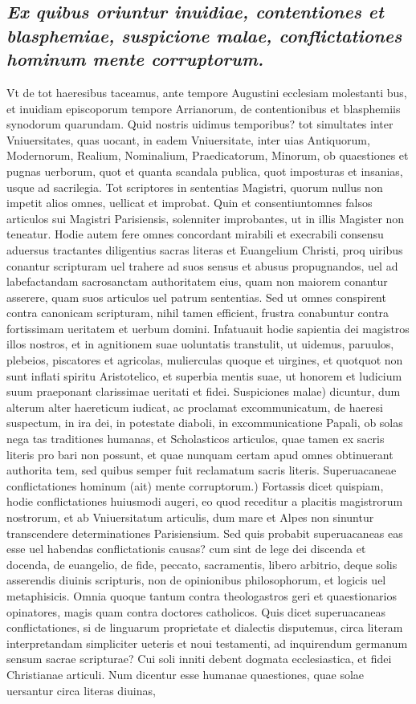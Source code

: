 \documentclass{article}
\begin{document}
\begin{pages}
\subsection*{\textit{Ex quibus oriuntur inuidiae, contentiones et blasphemiae, suspicione malae, conflictationes hominum mente corruptorum. }}\pstart Vt de tot haeresibus taceamus, ante tempore Augustini ecclesiam molestanti bus, et inuidiam episcoporum tempore Arrianorum, de contentionibus et blasphemiis synodorum quarundam. Quid nostris uidimus temporibus? tot simultates inter Vniuersitates, quas uocant, in eadem Vniuersitate, inter uias Antiquorum, Modernorum, Realium, Nominalium, Praedicatorum, Minorum, ob quaestiones et pugnas uerborum, quot et quanta scandala publica, quot imposturas et insanias, usque ad sacrilegia. Tot scriptores in sententias Magistri, quorum nullus non impetit alios omnes, uellicat et improbat. Quin et consentiuntomnes falsos articulos sui Magistri Parisiensis, solenniter improbantes, ut in illis Magister non teneatur. Hodie autem fere omnes concordant mirabili et execrabili consensu aduersus tractantes diligentius sacras literas et Euangelium Christi, proq uiribus conantur scripturam uel trahere ad suos sensus et abusus propugnandos, uel ad labefactandam sacrosanctam authoritatem eius, quam non maiorem conantur asserere, quam suos articulos uel patrum sententias. Sed ut omnes conspirent contra canonicam scripturam, nihil tamen efficient, frustra conabuntur contra fortissimam ueritatem et uerbum domini. Infatuauit hodie sapientia dei magistros illos nostros, et in agnitionem suae uoluntatis transtulit, ut uidemus, paruulos, plebeios, piscatores et agricolas, mulierculas quoque et uirgines, et quotquot non sunt inflati spiritu Aristotelico, et superbia mentis suae, ut honorem et ludicium suum praeponant clarissimae ueritati et fidei. Suspiciones malae) dicuntur, dum alterum alter haereticum iudicat, ac proclamat excommunicatum, de haeresi suspectum, in ira dei, in potestate diaboli, in excommunicatione Papali, ob solas nega tas traditiones humanas, et Scholasticos articulos, quae tamen ex sacris literis pro bari non possunt, et quae nunquam certam apud omnes obtinuerant authorita tem, sed quibus semper fuit reclamatum sacris literis. Superuacaneae conflictationes hominum (ait) mente corruptorum.) Fortassis dicet quispiam, hodie conflictationes huiusmodi augeri, eo quod receditur a placitis magistrorum nostrorum, et ab Vniuersitatum articulis, dum mare et Alpes non sinuntur transcendere determinationes Parisiensium. Sed quis probabit superuacaneas eas esse uel habendas conflictationis causas? cum sint de lege dei discenda et docenda, de euangelio, de fide, peccato, sacramentis, libero arbitrio, deque solis asserendis diuinis scripturis, non de opinionibus philosophorum, et logicis uel metaphisicis. Omnia quoque tantum contra theologastros geri et quaestionarios opinatores, magis quam contra doctores catholicos. Quis dicet superuacaneas conflictationes, si de linguarum proprietate et dialectis disputemus, circa literam interpretandam simpliciter ueteris et noui testamenti, ad inquirendum germanum sensum sacrae scripturae? Cui soli inniti debent dogmata ecclesiastica, et fidei Christianae articuli. Num dicentur esse humanae quaestiones, quae solae uersantur circa literas diuinas,  \pend

\end{pages}
\end{document}
